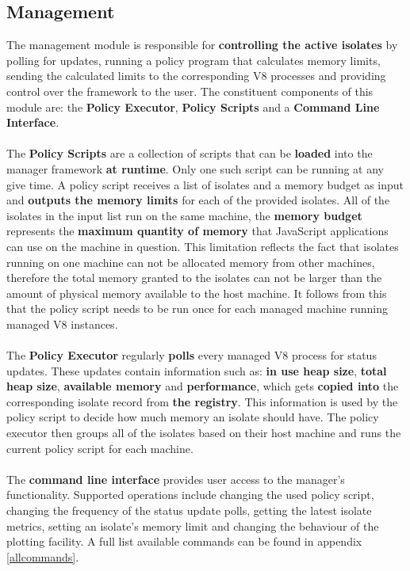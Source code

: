 \documentclass{l4proj}
\begin{document}
\subsection{Management}
\hspace*{1em} The management module is responsible for \textbf{controlling the active isolates} by polling for updates, running a policy program that calculates memory limits, sending the calculated limits to the corresponding V8 processes and providing control over the framework to the user. The constituent components of this module are: the \textbf{Policy Executor}, \textbf{Policy Scripts} and a \textbf{Command Line Interface}.
\\\\
\hspace*{1em} The \textbf{Policy Scripts} are a collection of scripts that can be \textbf{loaded} into the manager framework \textbf{at runtime}. Only one such script can be running at any give time. A policy script receives a list of isolates and a memory budget as input and \textbf{outputs the memory limits} for each of the provided isolates. All of the isolates in the input list run on the same machine, the \textbf{memory budget} represents the \textbf{maximum quantity of memory} that JavaScript applications can use on the machine in question. This limitation reflects the fact that isolates running on one machine can not be allocated memory from other machines, therefore the total memory granted to the isolates can not be larger than the amount of physical memory available to the host machine. It follows from this that the policy script needs to be run once for each managed machine running managed V8 instances. 
\\\\
\hspace*{1em} The \textbf{Policy Executor} regularly \textbf{polls} every managed V8 process for status updates. These updates contain information such as: \textbf{in use heap size}, \textbf{total heap size}, \textbf{available memory} and \textbf{performance}, which gets \textbf{copied into} the corresponding isolate record from  \textbf{the registry}. This information is used by the policy script to decide how much memory an isolate should have. The policy executor then groups all of the isolates based on their host machine and runs the current policy script for each machine.
\\\\
\hspace*{1em} The \textbf{command line interface} provides user access to the manager's functionality. Supported operations include changing the used policy script, changing the frequency of the status update polls, getting the latest isolate metrics, setting an isolate's memory limit and changing the behaviour of the plotting facility. A full list available commands can be found in appendix \ref{allcommands}.
\end{document}
